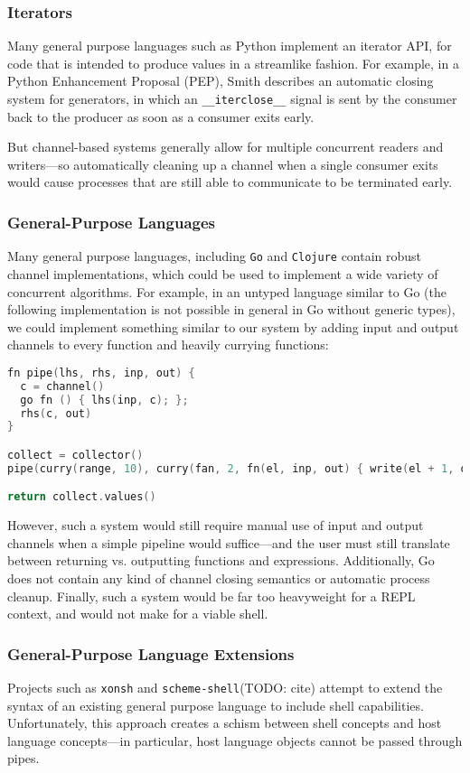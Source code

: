 \documentclass[english,preprint,JIP,uplatex]{ipsj}
\begin{document}
\subsubsection{Iterators}
\noindent
Many general purpose languages such as Python implement an iterator API, for code that is intended to produce values in a streamlike fashion. For example, in a Python Enhancement Proposal (PEP), Smith\cite{pep533} describes an automatic closing system for generators, in which an \verb/__iterclose__/ signal is sent by the consumer back to the producer as soon as a consumer exits early.

But channel-based systems generally allow for multiple concurrent readers and writers---so automatically cleaning up a channel when a single consumer exits would cause processes that are still able to communicate to be terminated early.

\subsubsection{General-Purpose Languages}

\noindent
Many general purpose languages, including \verb/Go/ and \verb/Clojure/ contain robust channel implementations, which could be used to implement a wide variety of concurrent algorithms. For example, in an untyped language similar to Go (the following implementation is not possible in general in Go without generic types), we could implement something similar to our system by adding input and output channels to every function and heavily currying functions:
\begin{lstlisting}[language=C, morekeywords={fn,channel,nil,go}]
fn pipe(lhs, rhs, inp, out) {
  c = channel()
  go fn () { lhs(inp, c); };
  rhs(c, out)
}

collect = collector()
pipe(curry(range, 10), curry(fan, 2, fn(el, inp, out) { write(el + 1, out); }), nil, collect);

return collect.values()
\end{lstlisting}
\noindent
However, such a system would still require manual use of input and output channels when a simple pipeline would suffice---and the user must still translate between returning vs. outputting functions and expressions. Additionally, Go does not contain any kind of channel closing semantics or automatic process cleanup. Finally, such a system would be far too heavyweight for a REPL context, and would not make for a viable shell.

\subsubsection{General-Purpose Language Extensions}
\noindent
Projects such as \verb/xonsh/\cite{xonsh} and \verb/scheme-shell/(TODO: cite) attempt to extend the syntax of an existing general purpose language to include shell capabilities. Unfortunately, this approach creates a schism between shell concepts and host language concepts---in particular, host language objects cannot be passed through pipes.
\end{document}

